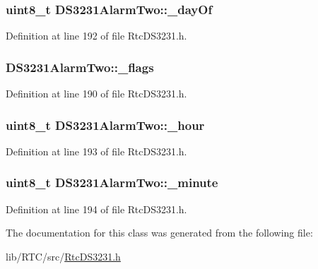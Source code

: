 \subsubsection[{\texorpdfstring{\+\_\+day\+Of}{_dayOf}}]{\setlength{\rightskip}{0pt plus 5cm}uint8\+\_\+t D\+S3231\+Alarm\+Two\+::\+\_\+day\+Of\hspace{0.3cm}{\ttfamily [protected]}}\hypertarget{class_d_s3231_alarm_two_adb85a9af4e0e69a81b6deac0dddd2ed5}{}\label{class_d_s3231_alarm_two_adb85a9af4e0e69a81b6deac0dddd2ed5}


Definition at line 192 of file Rtc\+D\+S3231.\+h.

\subsubsection[{\texorpdfstring{\+\_\+flags}{_flags}}]{ D\+S3231\+Alarm\+Two\+::\+\_\+flags\hspace{0.3cm}{\ttfamily [protected]}}\hypertarget{class_d_s3231_alarm_two_af3ff262fa5904d0c71f8009a2c165174}{}\label{class_d_s3231_alarm_two_af3ff262fa5904d0c71f8009a2c165174}


Definition at line 190 of file Rtc\+D\+S3231.\+h.

\subsubsection[{\texorpdfstring{\+\_\+hour}{_hour}}]{\setlength{\rightskip}{0pt plus 5cm}uint8\+\_\+t D\+S3231\+Alarm\+Two\+::\+\_\+hour\hspace{0.3cm}{\ttfamily [protected]}}\hypertarget{class_d_s3231_alarm_two_a43f36d078c7268e3d810bf9eb99f2d30}{}\label{class_d_s3231_alarm_two_a43f36d078c7268e3d810bf9eb99f2d30}


Definition at line 193 of file Rtc\+D\+S3231.\+h.

\subsubsection[{\texorpdfstring{\+\_\+minute}{_minute}}]{\setlength{\rightskip}{0pt plus 5cm}uint8\+\_\+t D\+S3231\+Alarm\+Two\+::\+\_\+minute\hspace{0.3cm}{\ttfamily [protected]}}\hypertarget{class_d_s3231_alarm_two_a3d31a41a21535dbf1424dbec48dcdbbb}{}\label{class_d_s3231_alarm_two_a3d31a41a21535dbf1424dbec48dcdbbb}


Definition at line 194 of file Rtc\+D\+S3231.\+h.



The documentation for this class was generated from the following file\+:\begin{DoxyCompactItemize}
\item 
lib/\+R\+T\+C/src/\hyperlink{_rtc_d_s3231_8h}{Rtc\+D\+S3231.\+h}\end{DoxyCompactItemize}
